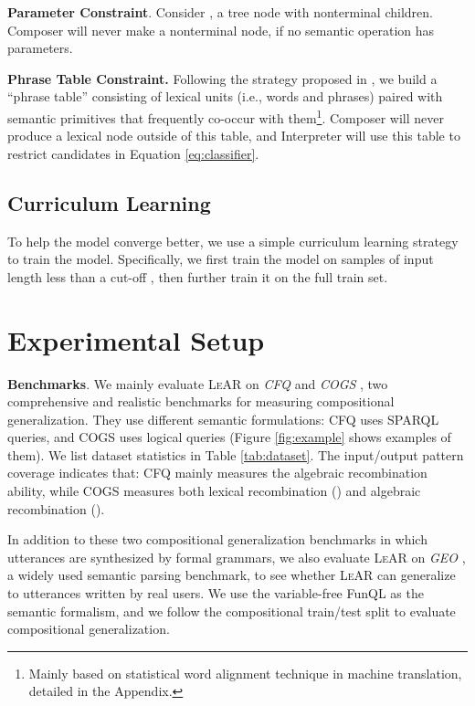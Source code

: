 \documentclass[11pt,a4paper]{article}
\begin{document}
\noindent \textbf{Parameter Constraint}.
Consider , a tree node with  nonterminal children.
Composer will never make  a nonterminal node, if no semantic operation has  parameters.

\noindent \textbf{Phrase Table Constraint.}
Following the strategy proposed in \citet{guo2020hierarchical}, we build a ``phrase table'' consisting of lexical units (i.e., words and phrases) paired with semantic primitives that frequently co-occur with them\footnote{Mainly based on statistical word alignment technique in machine translation, detailed in the Appendix.}.
Composer will never produce a lexical node outside of this table, and Interpreter will use this table to restrict candidates in Equation \ref{eq:classifier}.



\subsection{Curriculum Learning} \label{sec:curriculum}

To help the model converge better, we use a simple curriculum learning \cite{bengio2009curriculum} strategy to train the model.
Specifically, we first train the model on samples of input length less than a cut-off , then further train it on the full train set.







\section{Experimental Setup}

\noindent \textbf{Benchmarks}.
We mainly evaluate \textsc{LeAR} on \textit{CFQ} \cite{keysers2019measuring} and \textit{COGS} \cite{kim2020cogs}, two comprehensive and realistic benchmarks for measuring compositional generalization.
They use different semantic formulations:
CFQ uses SPARQL queries, and COGS uses logical queries (Figure \ref{fig:example} shows examples of them).
We list dataset statistics in Table \ref{tab:dataset}.
The input/output pattern coverage indicates that:
CFQ mainly measures the algebraic recombination ability, while COGS measures both lexical recombination () and algebraic recombination ().


In addition to these two compositional generalization benchmarks in which utterances are synthesized by formal grammars, we also evaluate \textsc{LeAR} on \textit{GEO} \cite{zelle1996learning-csp}, a widely used semantic parsing benchmark, to see whether \textsc{LeAR} can generalize to utterances written by real users.
We use the variable-free FunQL \cite{kate2005geofunql} as the semantic formalism, and we follow the compositional train/test split \cite{finegan2018geosplit} to evaluate compositional generalization.
\end{document}
